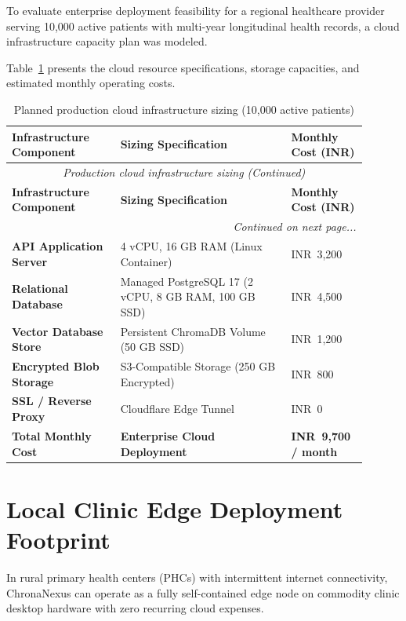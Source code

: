 To evaluate enterprise deployment feasibility for a regional healthcare provider serving 10,000 active patients with multi-year longitudinal health records, a cloud infrastructure capacity plan was modeled.

Table~\ref{tab:8_2_cloud} presents the cloud resource specifications, storage capacities, and estimated monthly operating costs.

\small
\begin{longtable}{@{}p{0.28\linewidth} p{0.44\linewidth} p{0.18\linewidth}@{}}
\caption{Planned production cloud infrastructure sizing (10,000 active patients)}\label{tab:8_2_cloud} \\
\toprule
\textbf{Infrastructure Component} & \textbf{Sizing Specification} & \textbf{Monthly Cost (INR)} \\
\midrule
\endfirsthead
\toprule
\multicolumn{3}{c}{\small\textit{Production cloud infrastructure sizing (Continued)}} \\[4pt]
\midrule
\textbf{Infrastructure Component} & \textbf{Sizing Specification} & \textbf{Monthly Cost (INR)} \\
\midrule
\endhead
\midrule
\multicolumn{3}{r}{\footnotesize\textit{Continued on next page...}} \\
\bottomrule
\endfoot
\bottomrule
\endlastfoot
\textbf{API Application Server} & 4 vCPU, 16 GB RAM (Linux Container) & INR~3,200 \\
\textbf{Relational Database} & Managed PostgreSQL 17 (2 vCPU, 8 GB RAM, 100 GB SSD) & INR~4,500 \\
\textbf{Vector Database Store} & Persistent ChromaDB Volume (50 GB SSD) & INR~1,200 \\
\textbf{Encrypted Blob Storage} & S3-Compatible Storage (250 GB Encrypted) & INR~800 \\
\textbf{SSL / Reverse Proxy} & Cloudflare Edge Tunnel & INR~0 \\
\midrule
\textbf{Total Monthly Cost} & \textbf{Enterprise Cloud Deployment} & \textbf{INR~9,700 / month} \\
\bottomrule
\end{longtable}
\normalsize


\section{Local Clinic Edge Deployment Footprint}
\label{sec:edge_sizing}

In rural primary health centers (PHCs) with intermittent internet connectivity, ChronaNexus can operate as a fully self-contained edge node on commodity clinic desktop hardware with zero recurring cloud expenses.


